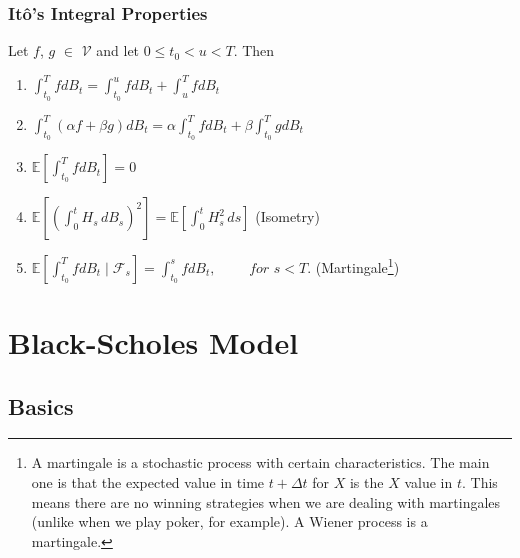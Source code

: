 \documentclass[12pt,oneside]{reedthesis}
\theoremstyle{definition}
\theoremstyle{definition}
\theoremstyle{remark}
\begin{document}
  \subsubsection{Itô's Integral
  Properties}\label{itos-integral-properties}
  
  Let \(f\), \(g\) \(\in\) \(\mathcal{V}\) and let \(0 \leq t_0 < u < T\).
  Then
  \begin{enumerate}[label=(\roman*)]
    \item $\displaystyle \int_{t_0}^{T}{f dB_t} = \int_{t_0}^{u}{f dB_t} + \int_{u}^{T}{f dB_t}$
    \item $\displaystyle \int_{t_0}^{T}{(\alpha f + \beta g) dB_t} = \alpha  \int_{t_0}^{T}{f dB_t} + \beta  \int_{t_0}^{T}{g dB_t}$
    \item $\displaystyle \mathbb{E}\left[ \int_{t_0}^{T}{fdB_t}\right] = 0 $
    \item $\displaystyle \mathbb {E} \left[\left(\int_{0}^{t}H_{s}\,dB_{s}\right)^{2}\right]=\mathbb {E} \left[\int _{0}^{t}H_{s}^{2}\,ds\right]$ (Isometry)
    \item $ \displaystyle \mathbb {E}\left[ \int_{t_0}^{T}{f dB_t \mid \mathcal{F}_{s}} \right] = \int_{t_0}^{s}{f dB_t}, \,\,\,\,\,\,\,\,\,\,\,\,\,\, for \,\, s < T.$  (Martingale\footnote{A martingale is a stochastic process with certain characteristics. The main one is that the expected value in time $t+\Delta t$ for $X$ is the $X$ value in $t$. This means there are no winning strategies when we are dealing with martingales (unlike when we play poker, for example). A Wiener process is a martingale.})
  \end{enumerate}
  \section{Black-Scholes Model}\label{black-scholes-model}
  
  \subsection{Basics}\label{basics}
  
\end{document}
